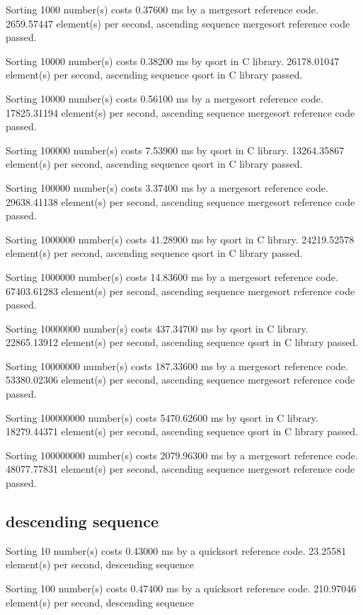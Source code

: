 \documentclass[12pt]{article}
\begin{document}
Sorting 1000 number(s) costs 0.37600 ms by a mergesort reference code. 2659.57447 element(s) per second, ascending sequence
mergesort reference code passed.

Sorting 10000 number(s) costs 0.38200 ms by qsort in C library. 26178.01047 element(s) per second, ascending sequence
qsort in C library passed.

Sorting 10000 number(s) costs 0.56100 ms by a mergesort reference code. 17825.31194 element(s) per second, ascending sequence
mergesort reference code passed.

Sorting 100000 number(s) costs 7.53900 ms by qsort in C library. 13264.35867 element(s) per second, ascending sequence
qsort in C library passed.

Sorting 100000 number(s) costs 3.37400 ms by a mergesort reference code. 29638.41138 element(s) per second, ascending sequence
mergesort reference code passed.

Sorting 1000000 number(s) costs 41.28900 ms by qsort in C library. 24219.52578 element(s) per second, ascending sequence
qsort in C library passed.

Sorting 1000000 number(s) costs 14.83600 ms by a mergesort reference code. 67403.61283 element(s) per second, ascending sequence
mergesort reference code passed.

Sorting 10000000 number(s) costs 437.34700 ms by qsort in C library. 22865.13912 element(s) per second, ascending sequence
qsort in C library passed.

Sorting 10000000 number(s) costs 187.33600 ms by a mergesort reference code. 53380.02306 element(s) per second, ascending sequence
mergesort reference code passed.

Sorting 100000000 number(s) costs 5470.62600 ms by qsort in C library. 18279.44371 element(s) per second, ascending sequence
qsort in C library passed.

Sorting 100000000 number(s) costs 2079.96300 ms by a mergesort reference code. 48077.77831 element(s) per second, ascending sequence
mergesort reference code passed.



\subsection{descending sequence}

Sorting 10 number(s) costs 0.43000 ms by a quicksort reference code. 23.25581 element(s) per second, descending sequence

Sorting 100 number(s) costs 0.47400 ms by a quicksort reference code. 210.97046 element(s) per second, descending sequence
\end{document}
